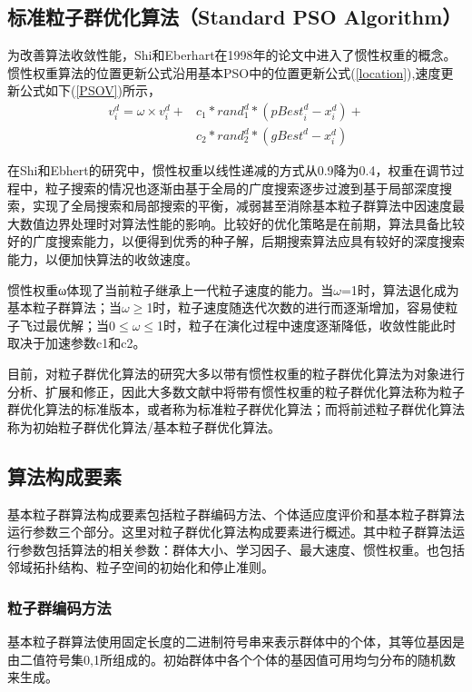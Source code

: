 \subsection{标准粒子群优化算法（Standard PSO Algorithm）}
为改善算法收敛性能，Shi和Eberhart在1998年的论文中进入了惯性权重的概念。惯性权重算法的位置更新公式沿用基本PSO中的位置更新公式(\ref{location}),速度更新公式如下(\ref{PSOV})所示，
\begin{equation}
\begin{split}
\label{PSOV}
v_i^d=\omega\times v_i^d+&c_1*{rand}_1^d*({pBest}_i^d-x_i^d)+\\ &c_2*{rand}_2^d*({gBest}^d-x_i^d)
\end{split}
\end{equation}

在Shi和Ebhert的研究中，惯性权重以线性递减的方式从0.9降为0.4，权重在调节过程中，粒子搜索的情况也逐渐由基于全局的广度搜索逐步过渡到基于局部深度搜索，实现了全局搜索和局部搜索的平衡，减弱甚至消除基本粒子群算法中因速度最大数值边界处理时对算法性能的影响。比较好的优化策略是在前期，算法具备比较好的广度搜索能力，以便得到优秀的种子解，后期搜索算法应具有较好的深度搜索能力，以便加快算法的收敛速度。

惯性权重ω体现了当前粒子继承上一代粒子速度的能力。当$\omega$=1时，算法退化成为基本粒子群算法；当$\omega$$\ge$1时，粒子速度随迭代次数的进行而逐渐增加，容易使粒子飞过最优解；当0$\le$$\omega$$\le$1时，粒子在演化过程中速度逐渐降低，收敛性能此时取决于加速参数c1和c2。

目前，对粒子群优化算法的研究大多以带有惯性权重的粒子群优化算法为对象进行分析、扩展和修正，因此大多数文献中将带有惯性权重的粒子群优化算法称为粒子群优化算法的标准版本，或者称为标准粒子群优化算法；而将前述粒子群优化算法称为初始粒子群优化算法/基本粒子群优化算法。

\subsection{算法构成要素}
基本粒子群算法构成要素包括粒子群编码方法、个体适应度评价和基本粒子群算法运行参数三个部分。这里对粒子群优化算法构成要素进行概述。其中粒子群算法运行参数包括算法的相关参数：群体大小、学习因子、最大速度、惯性权重。也包括邻域拓扑结构、粒子空间的初始化和停止准则。
\subsubsection{粒子群编码方法}
基本粒子群算法使用固定长度的二进制符号串来表示群体中的个体，其等位基因是由二值符号集{0,1}所组成的。初始群体中各个个体的基因值可用均匀分布的随机数来生成。
